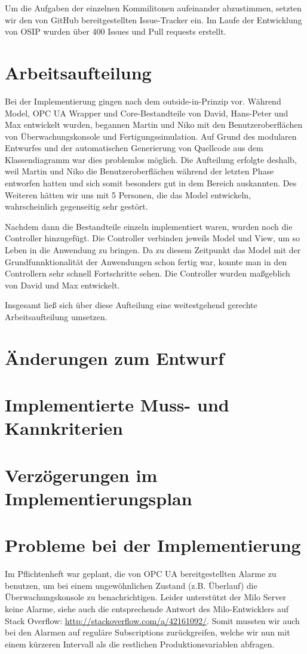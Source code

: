 \documentclass[parskip=full]{scrartcl}
\begin{document}
Um die Aufgaben der einzelnen Kommilitonen aufeinander abzustimmen, setzten wir den von GitHub bereitgestellten Issue-Tracker ein. Im Laufe der
Entwicklung von OSIP wurden über 400 Issues und Pull requests erstellt.

\section{Arbeitsaufteilung}
Bei der Implementierung gingen nach dem outside-in-Prinzip vor. Während Model, OPC UA Wrapper und Core-Bestandteile von David, Hans-Peter und Max entwickelt wurden,
begannen Martin und Niko mit den Benutzeroberflächen von Überwachungskonsole und Fertigungssimulation. Auf Grund des modularen Entwurfes
und der automatischen Generierung von Quellcode aus dem Klassendiagramm war dies problemlos möglich. Die Aufteilung erfolgte deshalb, weil Martin und Niko die
Benutzeroberflächen während der letzten Phase entworfen hatten und sich somit besonders gut in dem Bereich auskannten. Des Weiteren hätten wir uns mit 5 Personen,
die das Model entwickeln, wahrscheinlich gegenseitig sehr gestört.

Nachdem dann die Bestandteile einzeln implementiert waren, wurden noch die Controller hinzugefügt. Die Controller verbinden jeweils Model und View,
um so Leben in die Anwendung zu bringen. Da zu diesem Zeitpunkt das Model mit der Grundfunnktionalität der Anwendungen schon fertig war,
konnte man in den Controllern sehr schnell Fortschritte sehen. Die Controller wurden maßgeblich von David und Max entwickelt.

Insgesamt ließ sich über diese Aufteilung eine weitestgehend gerechte Arbeitsaufteilung umsetzen.

\section{Änderungen zum Entwurf}


\section{Implementierte Muss- und Kannkriterien}


\section{Verzögerungen im Implementierungsplan}


\section{Probleme bei der Implementierung}
Im Pflichtenheft war geplant, die von OPC UA bereitgestellten Alarme zu benutzen, um bei einem ungewöhnlichen Zustand (z.B. Überlauf)
die Überwachungskonsole zu benachrichtigen. Leider unterstützt der Milo Server keine Alarme, siehe auch die entsprechende Antwort
des Milo-Entwicklers auf Stack Overflow: \href{http://stackoverflow.com/a/42161092/}{http://stackoverflow.com/a/42161092/}.
Somit mussten wir auch bei den Alarmen auf reguläre Subscriptions zurückgreifen, welche wir nun mit einem kürzeren Intervall
als die restlichen Produktionsvariablen abfragen.
\end{document}
